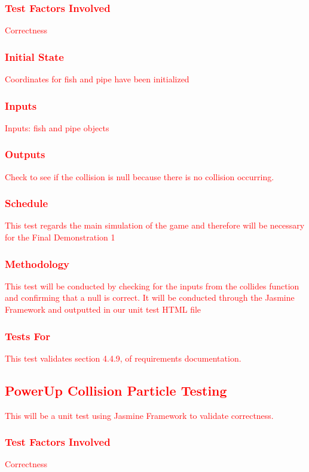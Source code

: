\documentclass[11pt, oneside]{article}   	%
\begin{document}
\subsubsection{\textcolor{red}{Test Factors Involved}}
\textcolor{red}{Correctness}
\subsubsection{\textcolor{red}{Initial State}}
\textcolor{red}{Coordinates for fish and pipe have been initialized}
\subsubsection{\textcolor{red}{Inputs}}
\textcolor{red}{Inputs: fish and pipe objects}
\subsubsection{\textcolor{red}{Outputs}}
\textcolor{red}{Check to see if the collision is null because there is no collision occurring.}
\subsubsection{\textcolor{red}{Schedule}}
\textcolor{red}{This test regards the main simulation of the game and therefore will be necessary for the Final Demonstration 1}
\subsubsection{\textcolor{red}{Methodology}}
\textcolor{red}{This test will be conducted by checking for the inputs from the collides function and confirming that a null is correct. It will be conducted through the Jasmine Framework and outputted in our unit test HTML file}
\subsubsection{\textcolor{red}{Tests For}}
\textcolor{red}{This test validates section 4.4.9, of requirements documentation.}




\subsection{\textcolor{red}{PowerUp Collision Particle Testing}}
\textcolor{red}{This will be a unit test using Jasmine Framework to validate correctness.}
\subsubsection{\textcolor{red}{Test Factors Involved}}
\textcolor{red}{Correctness}
\end{document}
